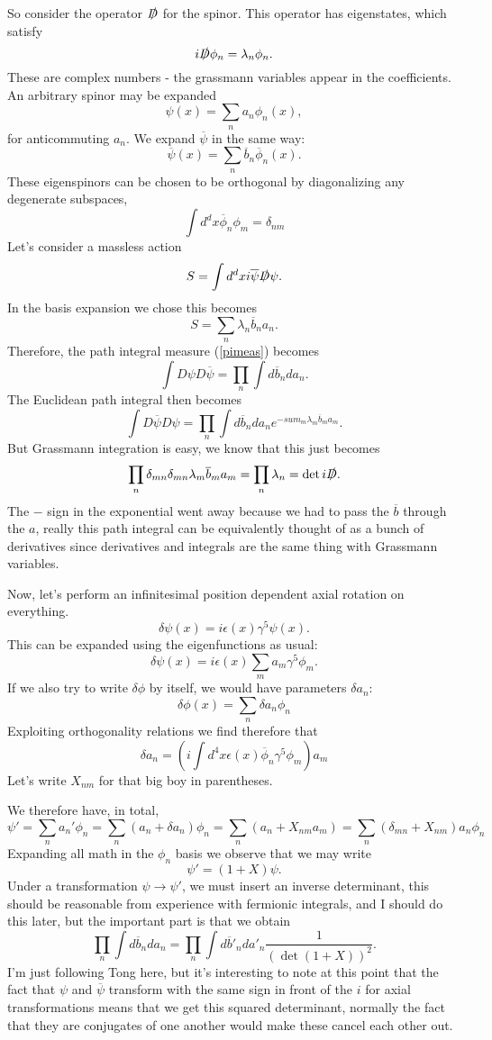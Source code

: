 \documentclass[main.tex]{subfiles}
\begin{document}
So consider the operator $\slashed{D}$ for the spinor. This operator has eigenstates, which satisfy
\[
i \slashed{D} \phi_n = \lambda_n \phi_n.
\]
These are complex numbers - the grassmann variables appear in the coefficients. An arbitrary spinor may be expanded
\[
\psi (x) = \sum_n a_n \phi_n (x),
\]
for anticommuting $a_n$. We expand $\overline{\psi}$ in the same way:
\[
\overline{\psi} (x) = \sum_n \overline{b}_n \overline{\phi}_n (x).
\]
These eigenspinors can be chosen to be orthogonal by diagonalizing any degenerate subspaces,
\[
\int d^d x \overline{\phi}_n \phi_m = \delta_{nm}
\]
Let's consider a massless action
\[
S = \int d^d x i \overline{\psi} \slashed{D} \psi.
\]
In the basis expansion we chose this becomes
\[
S = \sum_n \lambda_n \overline{b}_n a_n.
\]
Therefore, the path integral measure (\ref{pimeas}) becomes
\[
\int D \psi D \overline{\psi} = \prod_n \int d\overline{b}_n da_n.
\]
The Euclidean path integral then becomes
\[
\int D \overline{\psi} D \psi = \prod_n \int d\overline{b}_n da_n e^{-sum_m \lambda_m \overline{b}_m a_m}.
\]
But Grassmann integration is easy, we know that this just becomes
\[
\prod_n \delta_{mn} \delta_{mn} \lambda_m \overline{b}_m a_m = \prod_n \lambda_n = \det i \slashed{D}.
\]
The $-$ sign in the exponential went away because we had to pass the $\overline{b}$ through the $a$, really this path integral can be equivalently thought of as a bunch of derivatives since derivatives and integrals are the same thing with Grassmann variables.

Now, let's perform an infinitesimal position dependent axial rotation on everything.
\[
\delta \psi (x) = i \epsilon (x) \gamma^5 \psi (x).
\]
This can be expanded using the eigenfunctions as usual:
\[
\delta \psi (x) = i \epsilon(x) \sum_m a_m \gamma^5 \phi_m.
\]
If we also try to write $\delta \phi$ by itself, we would have parameters $\delta a_n$:
\[
\delta \phi (x) = \sum_n \delta a_n \phi_n
\]
Exploiting orthogonality relations we find therefore that 
\[
\delta a_n = \left( 
i \int d^4 x \epsilon (x) \overline{\phi}_n \gamma^5 \phi_m
\right) a_m
\]
Let's write $X_{nm}$ for that big boy in parentheses.

We therefore have, in total,
\[
\psi' = \sum_n a_n' \phi_n = \sum_n \left( a_n + \delta a_n \right)\phi_n = \sum_n \left( a_n + X_{nm} a_m \right) = \sum_n \left( \delta_{mn} + X_{nm} \right) a_n \phi_n
\]
Expanding all math in the $\phi_n$ basis we observe that we may write
\[
\psi' = (1 + X) \psi.
\]
Under a transformation $\psi \to \psi'$, we must insert an inverse determinant, this should be reasonable from experience with fermionic integrals, and I should do this later, but the important part is that we obtain
\[
\prod_n \int d\overline{b}_n da_n = \prod_n  \int d\overline{b}'_n da'_n \frac{1}{(\det (1 + X))^2}.
\]
I'm just following Tong here, but it's interesting to note at this point that the fact that $\psi$ and $\overline{\psi}$ transform with the same sign in front of the $i$ for axial transformations means that we get this squared determinant, normally the fact that they are conjugates of one another would make these cancel each other out.
\end{document}
